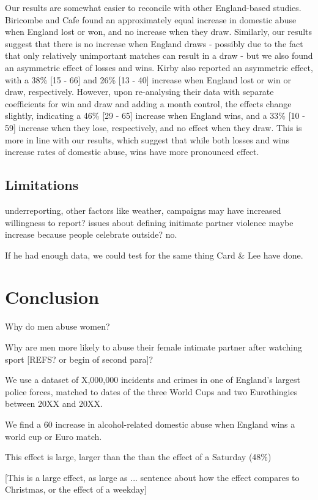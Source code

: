 \documentclass[12pt, letterpaper]{article}
\begin{document}
Our results are somewhat easier to reconcile with other England-based studies. Biricombe and Cafe found an approximately equal increase in domestic abuse when England lost or won, and no increase when they draw. Similarly, our results suggest that there is no increase when England draws - possibly due to the fact that only relatively unimportant matches can result in a draw - but we also found an asymmetric effect of losses and wins. Kirby also reported an asymmetric effect, with a 38\% [15 - 66] and 26\% [13 - 40] increase when England lost or win or draw, respectively. However, upon re-analysing their data with separate coefficients for win and draw and adding a month control, the effects change slightly, indicating a 46\% [29 - 65] increase when England wins, and a 33\% [10 - 59] increase when they lose, respectively, and no effect when they draw. This is more in line with our results, which suggest that while both losses and wins increase rates of domestic abuse, wins have more pronounced effect.




\subsection{Limitations}
underreporting, other factors like weather, campaigns may have increased willingness to report? issues about defining initimate partner violence
maybe increase because people celebrate outside? no.

If he had enough data, we could test for the same thing Card \& Lee have done.

\section{Conclusion}


Why do men abuse women?


Why are men more likely to abuse their female intimate partner after watching sport [REFS? or begin of second para]?

We use a dataset of X,000,000 incidents and crimes in one of England's largest police forces, matched to dates of the three World Cups and two Eurothingies between 20XX and 20XX.

We find a 60 increase in alcohol-related domestic abuse when England wins a world cup or Euro match. 

This effect is large, larger than the  than the effect of a Saturday (48\%)

[This is a large effect, as large as ... sentence about how the effect compares to Christmas, or the effect of a weekday]
\end{document}
